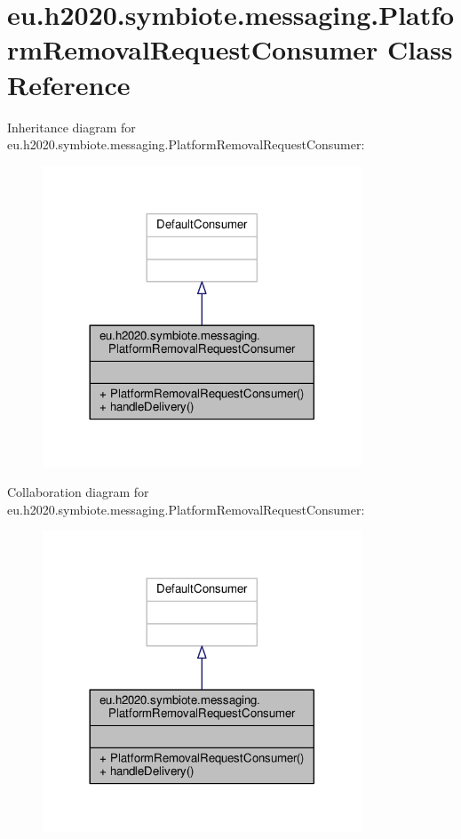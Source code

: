 \hypertarget{classeu_1_1h2020_1_1symbiote_1_1messaging_1_1PlatformRemovalRequestConsumer}{}\section{eu.\+h2020.\+symbiote.\+messaging.\+Platform\+Removal\+Request\+Consumer Class Reference}
\label{classeu_1_1h2020_1_1symbiote_1_1messaging_1_1PlatformRemovalRequestConsumer}


Inheritance diagram for eu.\+h2020.\+symbiote.\+messaging.\+Platform\+Removal\+Request\+Consumer\+:
\nopagebreak
\begin{figure}[H]
\begin{center}
\leavevmode
\includegraphics[width=269pt]{classeu_1_1h2020_1_1symbiote_1_1messaging_1_1PlatformRemovalRequestConsumer__inherit__graph}
\end{center}
\end{figure}


Collaboration diagram for eu.\+h2020.\+symbiote.\+messaging.\+Platform\+Removal\+Request\+Consumer\+:
\nopagebreak
\begin{figure}[H]
\begin{center}
\leavevmode
\includegraphics[width=269pt]{classeu_1_1h2020_1_1symbiote_1_1messaging_1_1PlatformRemovalRequestConsumer__coll__graph}
\end{center}
\end{figure}
